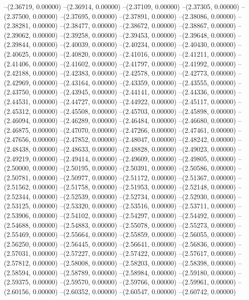 --(2.36719, 0.00000)
--(2.36914, 0.00000)
--(2.37109, 0.00000)
--(2.37305, 0.00000)
--(2.37500, 0.00000)
--(2.37695, 0.00000)
--(2.37891, 0.00000)
--(2.38086, 0.00000)
--(2.38281, 0.00000)
--(2.38477, 0.00000)
--(2.38672, 0.00000)
--(2.38867, 0.00000)
--(2.39062, 0.00000)
--(2.39258, 0.00000)
--(2.39453, 0.00000)
--(2.39648, 0.00000)
--(2.39844, 0.00000)
--(2.40039, 0.00000)
--(2.40234, 0.00000)
--(2.40430, 0.00000)
--(2.40625, 0.00000)
--(2.40820, 0.00000)
--(2.41016, 0.00000)
--(2.41211, 0.00000)
--(2.41406, 0.00000)
--(2.41602, 0.00000)
--(2.41797, 0.00000)
--(2.41992, 0.00000)
--(2.42188, 0.00000)
--(2.42383, 0.00000)
--(2.42578, 0.00000)
--(2.42773, 0.00000)
--(2.42969, 0.00000)
--(2.43164, 0.00000)
--(2.43359, 0.00000)
--(2.43555, 0.00000)
--(2.43750, 0.00000)
--(2.43945, 0.00000)
--(2.44141, 0.00000)
--(2.44336, 0.00000)
--(2.44531, 0.00000)
--(2.44727, 0.00000)
--(2.44922, 0.00000)
--(2.45117, 0.00000)
--(2.45312, 0.00000)
--(2.45508, 0.00000)
--(2.45703, 0.00000)
--(2.45898, 0.00000)
--(2.46094, 0.00000)
--(2.46289, 0.00000)
--(2.46484, 0.00000)
--(2.46680, 0.00000)
--(2.46875, 0.00000)
--(2.47070, 0.00000)
--(2.47266, 0.00000)
--(2.47461, 0.00000)
--(2.47656, 0.00000)
--(2.47852, 0.00000)
--(2.48047, 0.00000)
--(2.48242, 0.00000)
--(2.48438, 0.00000)
--(2.48633, 0.00000)
--(2.48828, 0.00000)
--(2.49023, 0.00000)
--(2.49219, 0.00000)
--(2.49414, 0.00000)
--(2.49609, 0.00000)
--(2.49805, 0.00000)
--(2.50000, 0.00000)
--(2.50195, 0.00000)
--(2.50391, 0.00000)
--(2.50586, 0.00000)
--(2.50781, 0.00000)
--(2.50977, 0.00000)
--(2.51172, 0.00000)
--(2.51367, 0.00000)
--(2.51562, 0.00000)
--(2.51758, 0.00000)
--(2.51953, 0.00000)
--(2.52148, 0.00000)
--(2.52344, 0.00000)
--(2.52539, 0.00000)
--(2.52734, 0.00000)
--(2.52930, 0.00000)
--(2.53125, 0.00000)
--(2.53320, 0.00000)
--(2.53516, 0.00000)
--(2.53711, 0.00000)
--(2.53906, 0.00000)
--(2.54102, 0.00000)
--(2.54297, 0.00000)
--(2.54492, 0.00000)
--(2.54688, 0.00000)
--(2.54883, 0.00000)
--(2.55078, 0.00000)
--(2.55273, 0.00000)
--(2.55469, 0.00000)
--(2.55664, 0.00000)
--(2.55859, 0.00000)
--(2.56055, 0.00000)
--(2.56250, 0.00000)
--(2.56445, 0.00000)
--(2.56641, 0.00000)
--(2.56836, 0.00000)
--(2.57031, 0.00000)
--(2.57227, 0.00000)
--(2.57422, 0.00000)
--(2.57617, 0.00000)
--(2.57812, 0.00000)
--(2.58008, 0.00000)
--(2.58203, 0.00000)
--(2.58398, 0.00000)
--(2.58594, 0.00000)
--(2.58789, 0.00000)
--(2.58984, 0.00000)
--(2.59180, 0.00000)
--(2.59375, 0.00000)
--(2.59570, 0.00000)
--(2.59766, 0.00000)
--(2.59961, 0.00000)
--(2.60156, 0.00000)
--(2.60352, 0.00000)
--(2.60547, 0.00000)
--(2.60742, 0.00000)
